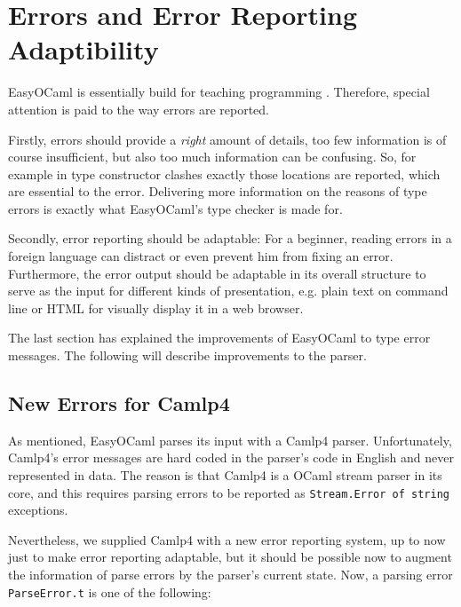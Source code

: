 
\section{Errors and Error Reporting Adaptibility}
\label{hd003}
EasyOCaml is essentially build for teaching programming .  Therefore, 
special attention is paid to the way errors are reported.

Firstly, errors should provide a \emph{right} amount of details, too few 
information is of course insufficient, but also too much information can 
be confusing. So, for example in type constructor clashes exactly those 
locations are reported, which are essential to the error.  Delivering 
more information on the reasons of type errors is exactly what 
EasyOCaml's type checker is made for.

Secondly, error reporting should be adaptable: For a beginner, reading 
errors in a foreign language can distract or even prevent him from 
fixing an error. Furthermore, the error output should be adaptable in 
its overall structure to serve as the input for different kinds of 
presentation, e.g. plain text on command line or HTML for visually 
display it in a web browser.

The last section has explained the improvements of EasyOCaml to type 
error messages. The following will describe improvements to the parser.


\subsection{New Errors for Camlp4}
\label{hd003001}
As mentioned, EasyOCaml parses its input with a Camlp4 parser.  
Unfortunately, Camlp4's error messages are hard coded in the parser's 
code in English and never represented in data.  The reason is that 
Camlp4 is a OCaml stream parser in its core, and this requires parsing 
errors to be reported as \texttt{Stream.Error~of~string} exceptions.

Nevertheless, we supplied Camlp4 with a new error reporting system, up 
to now just to make error reporting adaptable, but it should be possible 
now to augment the information of parse errors by the parser's current 
state. Now, a parsing error \texttt{ParseError.t} is one of the 
following:


